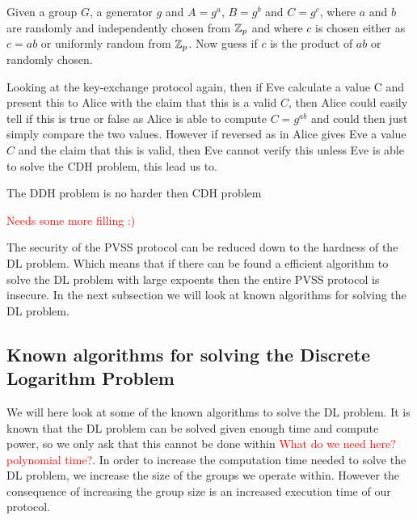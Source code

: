 \begin{defi} 
    Given a group $G$, a generator $g$ and $A = g^a$, $B = g^b$ and $C = g^c$, where $a$ and $b$ are randomly and independently chosen from $\mathbb{Z}_p$ and where $c$ is chosen either as $c = ab$ or uniformly random from $\mathbb{Z}_p$. Now guess if $c$ is the product of $ab$ or randomly chosen.   
\end{defi}

Looking at the key-exchange protocol again, then if Eve calculate a value C and present this to Alice with the claim that this is a valid $C$, then Alice could easily tell if this is true or false as Alice is able to compute $C = g^{ab}$ and could then just simply compare the two values. However if reversed as in Alice gives Eve a value $C$ and the claim that this is valid, then Eve cannot verify this unless Eve is able to solve the CDH problem, this lead us to.

\begin{lemma}
The DDH problem is no harder then CDH problem
\end{lemma}

\textcolor{red}{Needs some more filling :)}

The security of the PVSS protocol can be reduced down to the hardness of the DL problem. Which means that if there can be found a efficient algorithm to solve the DL problem with large expoents then the entire PVSS protocol is insecure. In the next subsection we will look at known algorithms for solving the DL problem. 

\subsection{Known algorithms for solving the Discrete Logarithm Problem}
We will here look at some of the known algorithms to solve the DL problem. It is known that the DL problem can be solved given enough time and compute power, so we only ask that this cannot be done within \textcolor{red}{What do we need here?  polynomial time?}. In order to increase the computation time needed to solve the DL problem, we increase the size of the groups we operate within. However the consequence of increasing the group size is an increased execution time of our protocol. \\

